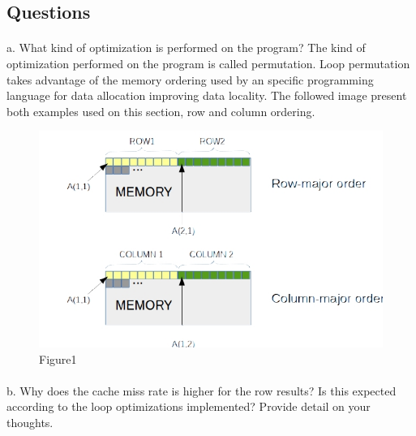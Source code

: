 \documentclass[xcolor=table]{llncs}
\begin{document}
\subsection{Questions}
\paragraph{}
a. What kind of optimization is performed on the program?\newline
The kind of optimization performed on the program is called permutation. Loop permutation takes advantage of the memory ordering used by an specific programming language for data allocation improving data locality. The followed image present both examples used on this section, row and column ordering.\newline
\begin{figure}
\includegraphics[scale=0.4]{row_column.jpg}
\centering
\caption{Figure1}
\label{fig: Row and Column ordering implemented in the section 2}
\end{figure}\newline
\paragraph{}
b. Why does the cache miss rate is higher for the row results? Is this expected according to the loop optimizations implemented? Provide detail on your thoughts.\newline
\end{document}
